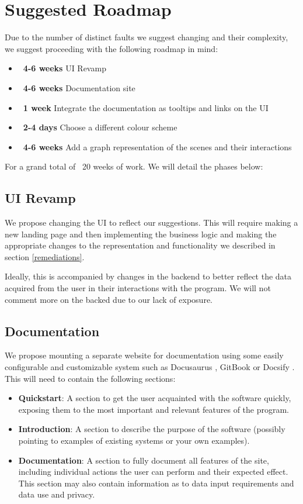 \documentclass[sigconf]{acmart}
\begin{document}
\section{Suggested Roadmap}
Due to the number of distinct faults we suggest changing and their complexity, we suggest proceeding with the following roadmap in mind:
\begin{itemize}
  \item \textbf{~4-6 weeks} UI Revamp
  \item \textbf{~4-6 weeks} Documentation site
  \item \textbf{~1 week} Integrate the documentation as tooltips and links on the UI
  \item \textbf{~2-4 days} Choose a different colour scheme
  \item \textbf{~4-6 weeks} Add a graph representation of the scenes and their interactions
\end{itemize}
For a grand total of ~20 weeks of work. We will detail the phases below:

\subsection{UI Revamp}
We propose changing the UI to reflect our suggestions. This will require making a new landing page and then implementing the business logic and making the appropriate changes to the representation and functionality we described in section \ref{remediations}.

Ideally, this is accompanied by changes in the backend to better reflect the data acquired from the user in their interactions with the program. We will not comment more on the backed due to our lack of exposure.

\subsection{Documentation}
We propose mounting a separate website for documentation using some easily configurable and customizable system such as Docusaurus \cite{docusaurus}, GitBook \cite{GitBook} or Docsify \cite{Docsify}. This will need to contain the following sections:
\begin{itemize}
  \item \textbf{Quickstart}: A section to get the user acquainted with the software quickly, exposing them to the most important and relevant features of the program.
  \item \textbf{Introduction}: A section to describe the purpose of the software (possibly pointing to examples of existing systems or your own examples).
  \item \textbf{Documentation}: A section to fully document all features of the site, including individual actions the user can perform and their expected effect. This section may also contain information as to data input requirements and data use and privacy.
\end{itemize}
\end{document}
